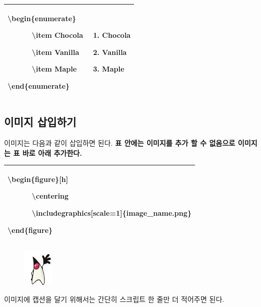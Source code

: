 \documentclass[12pt]{article}
\begin{document}
	\begin{tabularx}{\textwidth \onehalfspacing}{|X|X|}
		\hline
		\textbackslash begin\{enumerate\}
		
		\ \ \ \ \ \ \textbackslash item Chocola
		
		\ \ \ \ \ \ \textbackslash item Vanilla
		
		\ \ \ \ \ \ \textbackslash item Maple
		
		\textbackslash end\{enumerate\}
		&
		\begin{enumerate}
			\item Chocola
			\item Vanilla
			\item Maple
		\end{enumerate}
		\\
		\hline
	\end{tabularx}
	\clearpage
	\subsection{이미지 삽입하기}
	이미지는 다음과 같이 삽입하면 된다.\newline
	\textbf{표 안에는 이미지를 추가 할 수 없음으로 이미지는 표 바로 아래 추가한다.}\newline
	
	\begin{tabularx}{\textwidth \onehalfspacing}{|X|}
		\hline
		\textbackslash begin\{figure\}[h]
		
		\ \ \ \ \ \ \textbackslash centering
		
		\ \ \ \ \ \ \textbackslash includegraphics[scale=1]\{image\_name.png\}
		
		\textbackslash end\{figure\}
		\\
		\hline
	\end{tabularx}
	\begin{figure}[h]
		\centering
		\includegraphics[scale=1]{T6.png}
	\end{figure}
	\newline 이미지에 캡션을 달기 위해서는 간단히 스크립트 한 줄만 더 적어주면 된다.\newline
	
\end{document}
